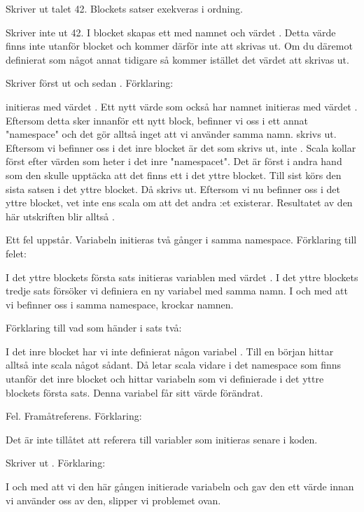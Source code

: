 \SubtaskSolved  Skriver ut talet 42. Blockets satser exekveras i ordning. 

\SubtaskSolved  Skriver inte ut 42. I blocket skapas ett  med namnet  och värdet . Detta värde finns inte utanför blocket och kommer därför inte att skrivas ut. Om du däremot definierat  som något annat tidigare så kommer istället det värdet att skrivas ut.

\SubtaskSolved  Skriver först ut  och sedan . Förklaring:

 initieras med värdet . Ett nytt värde som också har namnet  initieras med värdet . Eftersom detta sker innanför ett nytt block, befinner vi oss i ett annat "namespace" och det gör alltså inget att vi använder samma namn.  skrivs ut. Eftersom vi befinner oss i det inre blocket är det  som skrivs ut, inte . Scala kollar först efter värden som heter  i det inre "namespacet". Det är först i andra hand som den skulle upptäcka att det finns ett  i det yttre blocket. Till sist körs den sista satsen i det yttre blocket. Då skrivs  ut. Eftersom vi nu befinner oss i det yttre blocket, vet inte ens scala om att det andra :et existerar. Resultatet av den här utskriften blir alltså .

\SubtaskSolved  Ett fel uppstår. Variabeln  initieras två gånger i samma namespace. Förklaring till felet:

I det yttre blockets första sats initieras variablen  med värdet . I det yttre blockets tredje sats försöker vi definiera en ny variabel med samma namn. I och med att vi befinner oss i samma namespace, krockar namnen.

Förklaring till vad som händer i sats två:

I det inre blocket har vi inte definierat någon variabel . Till en början hittar alltså inte scala något sådant. Då letar scala vidare i det namespace som finns utanför det inre blocket och hittar variabeln som vi definierade i det yttre blockets första sats. Denna variabel får sitt värde förändrat.

\SubtaskSolved  Fel. Framåtreferens. Förklaring:

Det är inte tillåtet att referera till variabler som initieras senare i koden.

\SubtaskSolved  Skriver ut . Förklaring:

I och med att vi den här gången initierade variabeln  och gav den ett värde innan vi använder oss av den, slipper vi problemet ovan.

